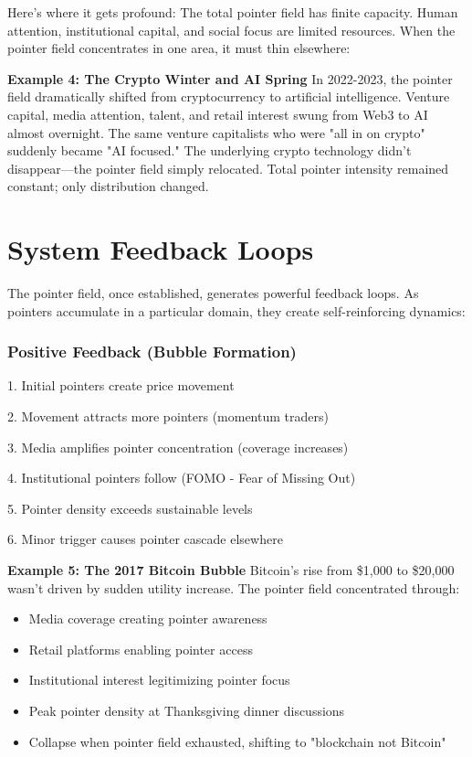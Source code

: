 \documentclass[11pt,oneside]{book}
\begin{document}
Here's where it gets profound: The total pointer field has finite capacity. Human attention, institutional capital, and social focus are limited resources. When the pointer field concentrates in one area, it must thin elsewhere:

\textbf{Example 4: The Crypto Winter and AI Spring}
In 2022-2023, the pointer field dramatically shifted from cryptocurrency to artificial intelligence. Venture capital, media attention, talent, and retail interest swung from Web3 to AI almost overnight. The same venture capitalists who were "all in on crypto" suddenly became "AI focused." The underlying crypto technology didn't disappear—the pointer field simply relocated. Total pointer intensity remained constant; only distribution changed.

\section{System Feedback Loops}

The pointer field, once established, generates powerful feedback loops. As pointers accumulate in a particular domain, they create self-reinforcing dynamics:

\subsubsection{Positive Feedback (Bubble Formation)}

1. Initial pointers create price movement


2. Movement attracts more pointers (momentum traders)


3. Media amplifies pointer concentration (coverage increases)


4. Institutional pointers follow (FOMO - Fear of Missing Out)


5. Pointer density exceeds sustainable levels


6. Minor trigger causes pointer cascade elsewhere


\textbf{Example 5: The 2017 Bitcoin Bubble}
Bitcoin's rise from \$1,000 to \$20,000 wasn't driven by sudden utility increase. The pointer field concentrated through:
\begin{itemize}
\item Media coverage creating pointer awareness
\item Retail platforms enabling pointer access
\item Institutional interest legitimizing pointer focus
\item Peak pointer density at Thanksgiving dinner discussions
\item Collapse when pointer field exhausted, shifting to "blockchain not Bitcoin"
\end{itemize}
\end{document}
